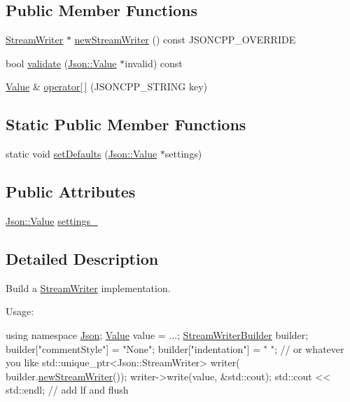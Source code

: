 \subsection*{Public Member Functions}
\begin{DoxyCompactItemize}
\item 
\hyperlink{classJson_1_1StreamWriter}{Stream\+Writer} $\ast$ \hyperlink{classJson_1_1StreamWriterBuilder_ab9ee278609f88ae04a7c1a84e1f559e6}{new\+Stream\+Writer} () const J\+S\+O\+N\+C\+P\+P\+\_\+\+O\+V\+E\+R\+R\+I\+DE
\item 
bool \hyperlink{classJson_1_1StreamWriterBuilder_a12353b97766841db7d049da84658da09}{validate} (\hyperlink{classJson_1_1Value}{Json\+::\+Value} $\ast$invalid) const
\item 
\hyperlink{classJson_1_1Value}{Value} \& \hyperlink{classJson_1_1StreamWriterBuilder_af68f6b59cb20b074052ed12bb3d336a3}{operator\mbox{[}$\,$\mbox{]}} (J\+S\+O\+N\+C\+P\+P\+\_\+\+S\+T\+R\+I\+NG key)
\end{DoxyCompactItemize}
\subsection*{Static Public Member Functions}
\begin{DoxyCompactItemize}
\item 
static void \hyperlink{classJson_1_1StreamWriterBuilder_a53bf106b141e28637b01ad0ecd2acbf6}{set\+Defaults} (\hyperlink{classJson_1_1Value}{Json\+::\+Value} $\ast$settings)
\end{DoxyCompactItemize}
\subsection*{Public Attributes}
\begin{DoxyCompactItemize}
\item 
\hyperlink{classJson_1_1Value}{Json\+::\+Value} \hyperlink{classJson_1_1StreamWriterBuilder_a79bdf2e639a52f4e758c0b95bd1d3423}{settings\+\_\+}
\end{DoxyCompactItemize}


\subsection{Detailed Description}
Build a \hyperlink{classJson_1_1StreamWriter}{Stream\+Writer} implementation. 

Usage\+: 
\begin{DoxyCode}
\textcolor{keyword}{using namespace }\hyperlink{namespaceJson}{Json};
\hyperlink{classJson_1_1Value}{Value} value = ...;
\hyperlink{classJson_1_1StreamWriterBuilder}{StreamWriterBuilder} builder;
builder[\textcolor{stringliteral}{"commentStyle"}] = \textcolor{stringliteral}{"None"};
builder[\textcolor{stringliteral}{"indentation"}] = \textcolor{stringliteral}{"   "};  \textcolor{comment}{// or whatever you like}
std::unique\_ptr<Json::StreamWriter> writer(
    builder.\hyperlink{classJson_1_1StreamWriterBuilder_ab9ee278609f88ae04a7c1a84e1f559e6}{newStreamWriter}());
writer->write(value, &std::cout);
std::cout << std::endl;  \textcolor{comment}{// add lf and flush}
\end{DoxyCode}
 

